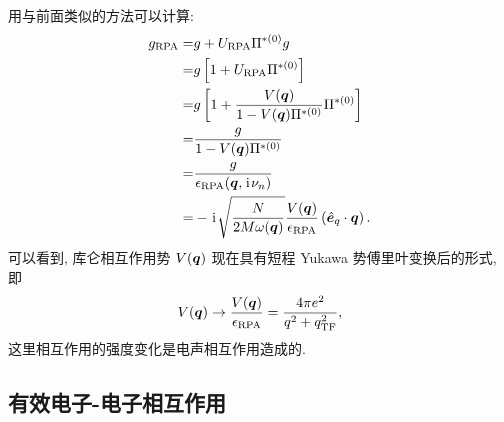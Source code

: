 用与前面类似的方法可以计算:
 \begin{align}
        g_{\mathrm{RPA}}=&g+U_{\mathrm{RPA}}\Pi^{*(0)}g\nonumber\\
        =&g\left[ 1+U_{\mathrm{RPA}}\Pi^{*(0)} \right]\nonumber\\
        =&g\left[ 1+\frac{V(\boldsymbol{q})}{1-V(\boldsymbol{q})\Pi^{*(0)}}\Pi^{*(0)} \right]\nonumber\\
        =&\frac{g}{1-V(\boldsymbol{q})\Pi^{*(0)}}\nonumber\\
        =&\frac{g}{\epsilon_{\mathrm{RPA}}(\boldsymbol{q},\hspace{0.1em}\mathrm{i}\hspace{0.1em}\nu_n)}\nonumber\\
        =&-\hspace{0.1em}\mathrm{i}\hspace{0.1em}\sqrt{\frac{N}{2M\omega(\boldsymbol{q})}}\frac{V(\boldsymbol{q})}{\epsilon_{\mathrm{RPA}}}\left( \hat{\boldsymbol{e}}_{q}\cdot \boldsymbol{q} \right).
    \end{align}
可以看到, 库仑相互作用势 $V(\boldsymbol{q})$ 现在具有短程 Yukawa 势傅里叶变换后的形式, 即 
\begin{equation}
    V(\boldsymbol{q})\to\frac{V(\boldsymbol{q})}{\epsilon_{\mathrm{RPA}}}=\frac{4\pi e^2}{q^2+q^2_{\mathrm{TF}}},
\end{equation}
这里相互作用的强度变化是电声相互作用造成的.

\subsection{有效电子-电子相互作用}

